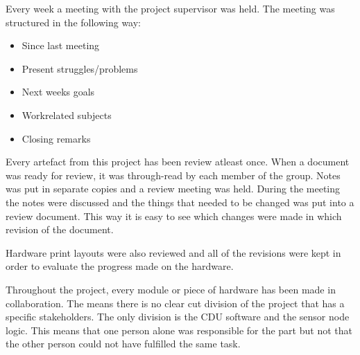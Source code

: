 Every week a meeting with the project supervisor was held. The meeting was structured in the following way:
\begin{itemize}
\item Since last meeting
\item Present struggles/problems
\item Next weeks goals
\item Workrelated subjects
\item Closing remarks
\end{itemize}

Every artefact from this project has been review atleast once. When a document was ready for review, it was through-read by each member of the group. Notes was put in separate copies and a review meeting was held. During the meeting the notes were discussed and the things that needed to be changed was put into a review document. This way it is easy to see which changes were made in which revision of the document. 

Hardware print layouts were also reviewed and all of the revisions were kept in order to evaluate the progress made on the hardware.

Throughout the project, every module or piece of hardware has been made in collaboration. The means there is no clear cut division of the project that has a specific stakeholders. The only division is the CDU software and the sensor node logic. This means that one person alone was responsible for the part but not that the other person could not have fulfilled the same task.

